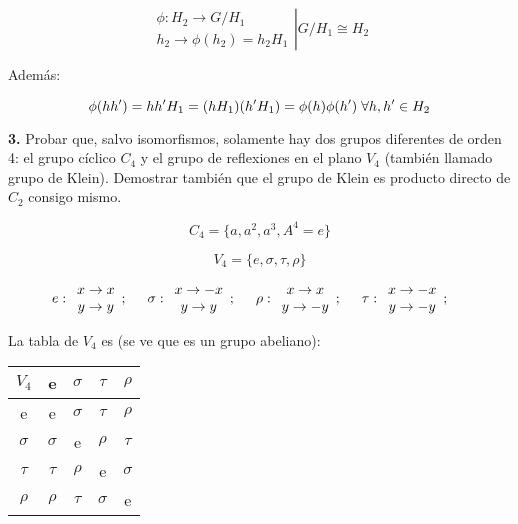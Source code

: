 $$ \left . \begin{array}{c}
\phi : H_2 \to G/H_1\\
h_2 \to \phi (h_2)=h_2H_1
\end{array} \right | G/H_1\cong H_2$$

Además:

$$\phi (hh')=hh'H_1=(hH_1)(h'H_1)=\phi (h) \phi (h') \hspace{0.1cm}\forall h,h' \in H_2$$

\bigskip
\textbf{3.} Probar que, salvo isomorfismos, solamente hay dos grupos diferentes de orden 4: el grupo cíclico $C_4$ y el grupo de
reflexiones en el plano $V_4$ (también llamado grupo de Klein). Demostrar también que el grupo de Klein es producto
directo de $C_2$ consigo mismo.

\smallskip
$$C_4=\lbrace  a,a^2,a^3,A^4=e\rbrace$$

$$V_4=\lbrace e,\sigma ,\tau ,\rho \rbrace$$

$$e: \begin{array}{c}
x\to x  \\
y\to y
\end{array}; \hspace{0.5cm} \sigma : \begin{array}{c}
x\to -x  \\
y\to y
\end{array}; \hspace{0.5cm} \rho : \begin{array}{c}
x\to x  \\
y\to -y
\end{array}; \hspace{0.5cm} \tau : \begin{array}{c}
x\to -x  \\
y\to -y
\end{array}; \hspace{0.5cm}$$

\smallskip
La tabla de $V_4$ es (se ve que es un grupo abeliano):

\begin{center}
\begin{tabular}[b]{ c | c c c c }
$V_4$ & e & $\sigma $ & $\tau $ & $\rho $\\
\hline
e & e & $\sigma $ & $\tau $ & $\rho $ \\
$\sigma $ & $\sigma $ & e & $\rho $ & $\tau $ \\
$\tau $ & $\tau $ & $\rho $ & e & $\sigma $ \\
$\rho $ & $\rho $ & $\tau $ & $\sigma $ & e
\end{tabular}
\end{center}



